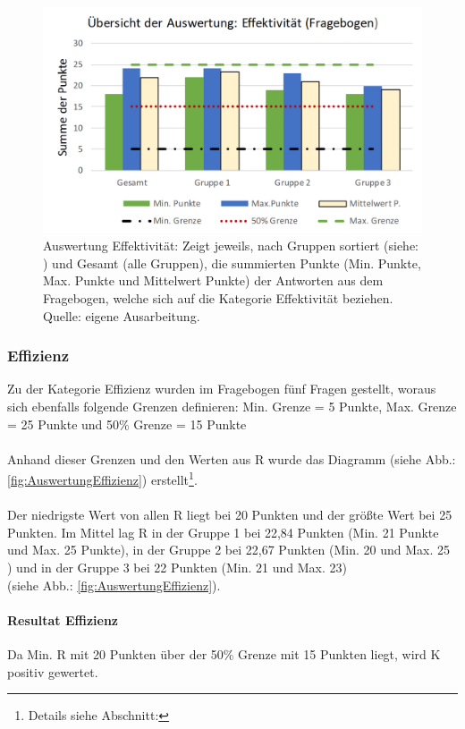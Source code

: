\documentclass[Bachelorarbeit.tex]{subfiles}
\begin{document}
\begin{figure}[H]
\centering
\includegraphics[width=0.9\linewidth]{img/Evaluation/Usability/AuswertungEffektivitaet}
\caption[Übersicht der Effektivität]{
	Auswertung Effektivität: Zeigt jeweils, nach Gruppen sortiert (siehe: ) und Gesamt (alle Gruppen), die summierten Punkte (Min. Punkte, Max. Punkte und Mittelwert Punkte) der Antworten aus dem Fragebogen, welche sich auf die Kategorie Effektivität beziehen. Quelle: eigene Ausarbeitung.
	}
\label{fig:AuswertungEffektivitaet}
\end{figure}


\subsubsection{Effizienz}
Zu der Kategorie Effizienz wurden im Fragebogen fünf Fragen gestellt, woraus sich ebenfalls folgende Grenzen definieren: Min. Grenze = 5 Punkte, Max. Grenze = 25 Punkte und 50\% Grenze = 15 Punkte\\
\\
Anhand dieser Grenzen und den Werten aus R wurde das Diagramm  (siehe Abb.: \ref{fig:AuswertungEffizienz}) erstellt\footnote{Details siehe Abschnitt: }.\\
\\
Der niedrigste Wert von allen R liegt bei 20 Punkten und der größte Wert bei 25 Punkten.
Im Mittel lag R in der Gruppe 1 bei 22,84 Punkten (Min. 21 Punkte und Max. 25 Punkte), in der Gruppe 2 bei 22,67 Punkten (Min. 20 und Max. 25 ) und in der Gruppe 3 bei 22 Punkten (Min. 21 und Max. 23)\\
(siehe Abb.: \ref{fig:AuswertungEffizienz}).

\paragraph{Resultat Effizienz} Da Min. R mit 20 Punkten über der 50\% Grenze mit 15 Punkten liegt, wird K positiv gewertet.
\end{document}
